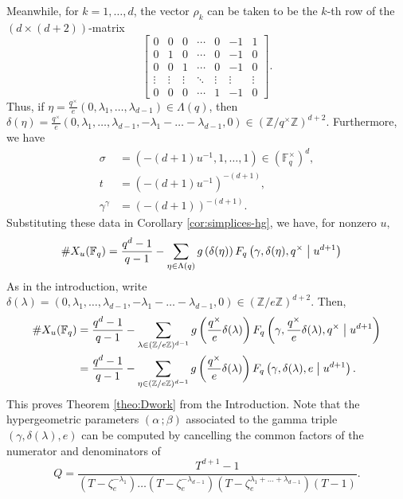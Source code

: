 \documentclass[11pt, reqno]{amsart}
\theoremstyle{plain}
\theoremstyle{definition}
\newcommand{\Z}{\mathbb{Z}}
\newcommand{\F}{\mathbb{F}}
\newcommand{\ga}{\gamma}
\newcommand{\be}{\beta}
\newcommand{\al}{\alpha}
\begin{document}
Meanwhile, for $k=1,\dots,d$, the vector $\rho_k$ can be taken to be the $k$-th row of the $(d\times(d+2))$-matrix
\[
\begin{bmatrix}
0& 0 & 0 & \cdots & 0 & -1 & 1 \\
0& 1 & 0 & \cdots & 0 & -1 & 0 \\
0& 0 & 1 & \cdots & 0 & -1 & 0 \\
\vdots &\vdots & \vdots & \ddots & \vdots & \vdots & \vdots \\
0& 0 & 0 & \cdots & 1 & -1 & 0
\end{bmatrix}.
\]
Thus, if $\eta= \frac{q^\times}{e}(0,\lambda_1,\dots,\lambda_{d-1}) \in \Lambda(q)$, then $\delta(\eta)  = \frac{q^\times}{e} (0,\lambda_1,\dots,\lambda_{d-1},-\lambda_1-\dots -\lambda_{d-1},0) \in \left( \Z/q^\times\Z\right)^{d+2}$. 
Furthermore, we have
\begin{align*}
    \sigma &=(-(d+1)u^{-1},1,\dots,1) \in \left(\F_q^\times\right)^{d},\\
    t &= (-(d+1) u^{-1})^{-(d+1)},\\
    \ga^{\ga} &= (-(d+1))^{-(d+1)}.
\end{align*}
Substituting these data in Corollary \ref{cor:simplices-hg}, we have, for nonzero $u,$
\begin{align*}
\#X_u(\F_q) &= \frac{q^{d}-1}{q-1} - \sum_{\eta \in \Lambda(q)} g\left(\delta(\eta )\right) F_q\left(\gamma,\delta(\eta), q^\times \bigm\vert u^{d+1}\right)
\end{align*}
As in the introduction, write $\delta(\lambda)  = (0,\lambda_1,\dots,\lambda_{d-1},-\lambda_1-\dots -\lambda_{d-1},0) \in \left( \Z/e\Z\right)^{d+2}$. Then,
\begin{align*}
    \#X_u(\F_q) &= \frac{q^{d}-1}{q-1} - \sum_{\lambda \in (\Z/e\Z)^{d-1}} g\left(\frac{q^\times}{e}\delta(\lambda)\right) F_q\left(\gamma, \frac{q^\times}{e} \delta(\lambda ), q^\times \bigm\vert u^{d+1}\right)\\
    &=\frac{q^{d}-1}{q-1} - \sum_{\eta \in (\Z/e\Z)^{d-1}} g\left(\frac{q^\times}{e}\delta(\lambda)\right) F_q\left(\gamma,  \delta(\lambda ), e \bigm\vert u^{d+1}\right).
\end{align*}
This proves Theorem \ref{theo:Dwork} from the Introduction. 
Note that the hypergeometric parameters $(\al \,;\be)$ associated to the gamma triple $(\ga,\delta(\lambda),e)$ can be computed by cancelling the common factors of the numerator and denominators of 
\[
Q= \frac{T^{d+1}-1}{(T- \zeta_{e}^{-\lambda_1}) \dots (T- \zeta_{e}^{-\lambda_{d-1}}) (T- \zeta_{e}^{\lambda_1+\dots +\lambda_{d-1}}) (T-1)}.
\]
\end{document}
